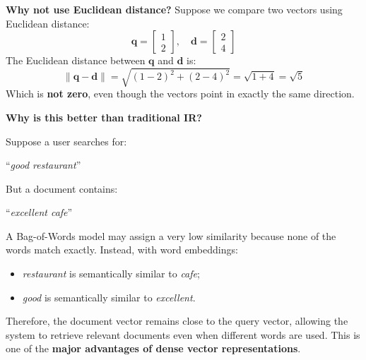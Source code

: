 \begin{definitionbox}
\begin{center}
\begin{tikzpicture}
        \end{tikzpicture}
    \end{center}

    \highspace
    \textcolor{Green3}{ \textbf{Why not use Euclidean distance?}} Suppose we compare two vectors using Euclidean distance:
    \begin{equation*}
        \mathbf{q} = \begin{bmatrix}
            1 \\ 2
        \end{bmatrix},
        \quad
        \mathbf{d} = \begin{bmatrix}
            2 \\ 4
        \end{bmatrix}
    \end{equation*}
    The Euclidean distance between $\mathbf{q}$ and $\mathbf{d}$ is:
    \begin{equation*}
        \left\|\mathbf{q} - \mathbf{d}\right\| = \sqrt{(1-2)^2 + (2-4)^2} = \sqrt{1 + 4} = \sqrt{5}
    \end{equation*}
    Which is \textbf{not zero}, even though the vectors point in exactly the same direction.
\end{definitionbox}

\highspace
\begin{flushleft}
    \textcolor{Green3}{ \textbf{Why is this better than traditional IR?}}
\end{flushleft}
Suppose a user searches for:
\begin{center}
    ``\emph{good restaurant}''
\end{center}
But a document contains:
\begin{center}
    ``\emph{excellent cafe}''
\end{center}
A Bag-of-Words model may assign a very low similarity because none of the words match exactly. Instead, with word embeddings:
\begin{itemize}
    \item \emph{restaurant} is semantically similar to \emph{cafe};
    \item \emph{good} is semantically similar to \emph{excellent}.
\end{itemize}
Therefore, the document vector remains close to the query vector, allowing the system to retrieve relevant documents even when different words are used. This is one of the \textbf{major advantages of dense vector representations}.

